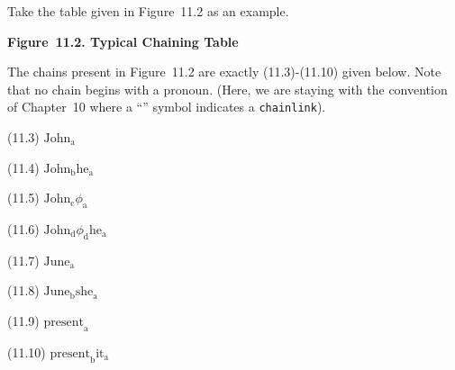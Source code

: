 \documentclass{article}
\begin{document}
Take the table given in Figure~11.2 as an example.


\bigbreak
\begin{minipage}{\textwidth}
\bigbreak
\textbf{Figure~11.2. Typical Chaining Table}
\end{minipage}
\bigbreak

The chains present in Figure~11.2 are exactly (11.3)-(11.10)
given below. Note that no chain begins with a pronoun. (Here, we
are staying with the convention of Chapter~10 where a
``\texttt{}'' symbol indicates a \texttt{chainlink}).

\begin{enumerate*}
\item[(11.3)] ${\textrm{John}_{\textrm{a}}}$
\item[(11.4)] ${\textrm{John}_{\textrm{b}}}$${\textrm{he}_{\textrm{a}}}$
\item[(11.5)] ${\textrm{John}_{\textrm{c}}}$${\phi_{\textrm{a}}}$
\item[(11.6)] ${\textrm{John}_{\textrm{d}}}$${\phi_{\textrm{d}}}$${\textrm{he}_{\textrm{a}}}$
\item[(11.7)] ${\textrm{June}_{\textrm{a}}}$
\item[(11.8)] ${\textrm{June}_{\textrm{b}}}$${\textrm{she}_{\textrm{a}}}$
\item[(11.9)] ${\textrm{present}_{\textrm{a}}}$
\item[(11.10)] ${\textrm{present}_{\textrm{b}}}$${\textrm{it}_{\textrm{a}}}$
\end{enumerate*}
\end{document}
